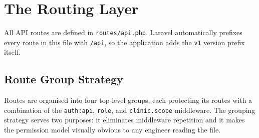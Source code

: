 \section{The Routing Layer}
\label{sec:routing}

All API routes are defined in \texttt{routes/api.php}. Laravel
automatically prefixes every route in this file with \texttt{/api},
so the application adds the \texttt{v1} version prefix itself.

\subsection{Route Group Strategy}

Routes are organised into four top-level groups, each protecting its
routes with a combination of the \texttt{auth:api}, \texttt{role}, and
\texttt{clinic.scope} middleware. The grouping strategy serves two
purposes: it eliminates middleware repetition and it makes the
permission model visually obvious to any engineer reading the file.

